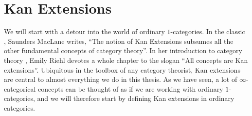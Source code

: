 \documentclass[../../thesis.tex]{subfiles}
\begin{document}
\section{Kan Extensions}\label{KanSection}
We will start with a detour into the world of ordinary $1$-categories.
In the classic \cite{MacLane}, Saunders MacLane writes, ``The notion of Kan Extensions subsumes all the other fundamental concepts of category theory''.
In her introduction to category theory \cite{CatContext}, Emily Riehl devotes a whole chapter to the slogan ``All concepts are Kan extensions''.
Ubiquitous in the toolbox of any category theorist, Kan extensions are central to almost everything we do in this thesis.
As we have seen, a lot of $\infty$-categorical concepts can be thought of as if we are working with ordinary $1$-categories, and we will therefore start by defining Kan extensions in ordinary categories.
\end{document}
